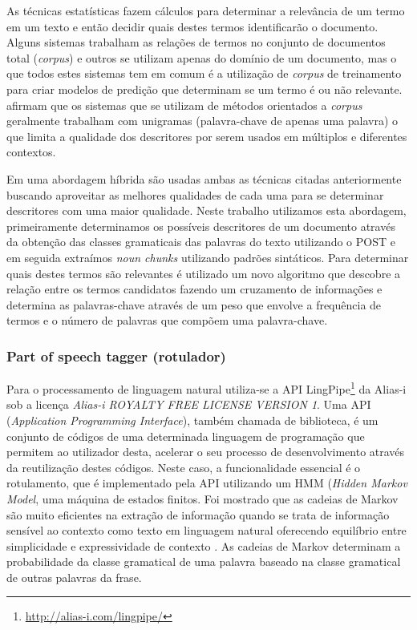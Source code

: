 As técnicas estatísticas fazem cálculos para determinar a relevância de um termo em um texto e então decidir quais destes termos identificarão o documento. Alguns sistemas trabalham as relações de termos no conjunto de documentos total (\emph{corpus}) e outros se utilizam apenas do domínio de um documento, mas o que todos estes sistemas tem em comum é a utilização de \emph{corpus} de treinamento para criar modelos de predição que determinam se um termo é ou não relevante. \cite{Berry2010} afirmam que os sistemas que se utilizam de métodos orientados a \emph{corpus} geralmente trabalham com unigramas (palavra-chave de apenas uma palavra) o que limita a qualidade dos descritores por serem usados em múltiplos e diferentes contextos.

Em uma abordagem híbrida são usadas ambas as técnicas citadas anteriormente buscando aproveitar as melhores qualidades de cada uma para se determinar descritores com uma maior qualidade. Neste trabalho utilizamos esta abordagem, primeiramente determinamos os possíveis descritores de um documento através da obtenção das classes gramaticais das palavras do texto utilizando o POST e em seguida extraímos \emph{noun chunks} utilizando padrões sintáticos. Para determinar quais destes termos são relevantes é utilizado um novo algoritmo que descobre a relação entre os termos candidatos fazendo um cruzamento de informações e determina as palavras-chave através de um peso que envolve a frequência de termos e o número de palavras que compõem uma palavra-chave.

\subsubsection{Part of speech tagger (rotulador)}
Para o processamento de linguagem natural utiliza-se a API LingPipe\footnote{\href{http://alias-i.com/lingpipe/}{http://alias-i.com/lingpipe/}} da Alias-i sob a licença \emph{Alias-i ROYALTY FREE LICENSE VERSION 1}. Uma API (\emph{Application Programming Interface}), também chamada de biblioteca, é um conjunto de códigos de uma determinada linguagem de programação que permitem ao utilizador desta, acelerar o seu processo de desenvolvimento através da reutilização destes códigos. Neste caso, a funcionalidade essencial é o rotulamento, que é implementado pela API utilizando um HMM (\emph{Hidden Markov Model}, uma máquina de estados finitos. Foi mostrado que as cadeias de Markov são muito eficientes na extração de informação quando se trata de informação sensível ao contexto como texto em linguagem natural oferecendo equilíbrio entre simplicidade e expressividade de contexto \cite{Freitag2000}. As cadeias de Markov determinam a probabilidade da classe gramatical de uma palavra baseado na classe gramatical de outras palavras da frase.

